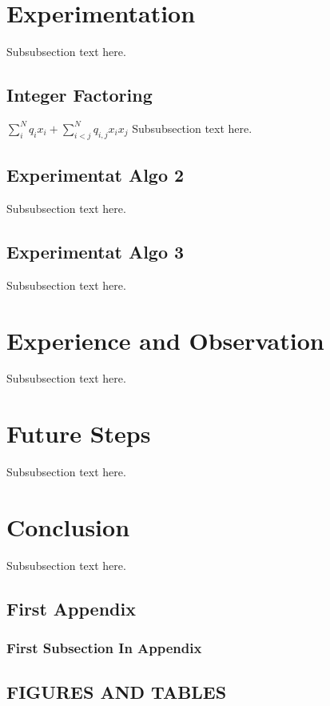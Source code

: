 \documentclass[12pt,conference]{IEEEtran}
\begin{document}
\section{Experimentation}
Subsubsection text here.

\subsection{Integer Factoring}
\hfill $\sum_i^N q_ix_i + \sum_{i<j}^N q_{i,j}x_i  x_j$
Subsubsection text here.
\subsection{Experimentat Algo 2}
Subsubsection text here.
\subsection{Experimentat Algo 3}
Subsubsection text here.

\section{Experience and Observation}
Subsubsection text here.

\section{Future Steps}
Subsubsection text here.

\section{Conclusion}
Subsubsection text here.


\appendix

\subsection{First Appendix}
\label{FirstAppendix}

\subsubsection{First Subsection In Appendix}
\label{FirstSubsectionAppendix}

\subsection{FIGURES AND TABLES}

\listoffigures

\end{document}
